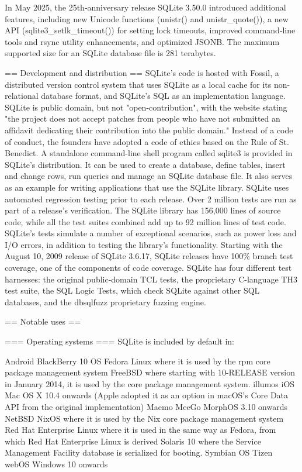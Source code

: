 In May 2025, the 25th‑anniversary release SQLite 3.50.0 introduced additional features, including new Unicode functions (unistr() and unistr\_quote()), a new API (sqlite3\_setlk\_timeout()) for setting lock timeouts, improved command‑line tools and rsync utility enhancements, and optimized JSONB.
The maximum supported size for an SQLite database file is 281 terabytes.


== Development and distribution ==
SQLite's code is hosted with Fossil, a distributed version control system that uses SQLite as a local cache for its non-relational database format, and SQLite's SQL as an implementation language.
SQLite is public domain, but not "open-contribution", with the website stating "the project does not accept patches from people who have not submitted an affidavit dedicating their contribution into the public domain." Instead of a code of conduct, the founders have adopted a code of ethics based on the Rule of St. Benedict.
A standalone command-line shell program called sqlite3 is provided in SQLite's distribution. It can be used to create a database, define tables, insert and change rows, run queries and manage an SQLite database file. It also serves as an example for writing applications that use the SQLite library.
SQLite uses automated regression testing prior to each release. Over 2 million tests are run as part of a release's verification. The SQLite library has 156,000 lines of source code, while all the test suites combined add up to 92 million lines of test code. SQLite's tests simulate a number of exceptional scenarios, such as power loss and I/O errors, in addition to testing the library's functionality. Starting with the August 10, 2009 release of SQLite 3.6.17, SQLite releases have 100\% branch test coverage, one of the components of code coverage. SQLite has four different test harnesses: the original public-domain TCL tests, the proprietary C-language TH3 test suite, the SQL Logic Tests, which check SQLite against other SQL databases, and the dbsqlfuzz proprietary fuzzing engine.


== Notable uses ==


=== Operating systems ===
SQLite is included by default in:

Android
BlackBerry 10 OS
Fedora Linux where it is used by the rpm core package management system
FreeBSD where starting with 10-RELEASE version in January 2014, it is used by the core package management system.
illumos
iOS
Mac OS X 10.4 onwards (Apple adopted it as an option in macOS's Core Data API from the original implementation)
Maemo
MeeGo
MorphOS 3.10 onwards
NetBSD
NixOS where it is used by the Nix core package management system
Red Hat Enterprise Linux where it is used in the same way as Fedora, from which Red Hat Enterprise Linux is derived
Solaris 10 where the Service Management Facility database is serialized for booting.
Symbian OS
Tizen
webOS
Windows 10 onwards


